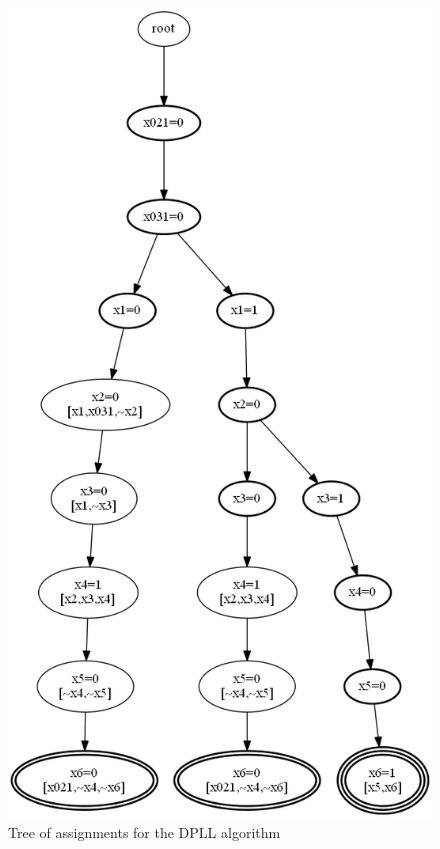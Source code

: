 \documentclass[11pt]{report}
\begin{document}
\begin{figure}
\begin{center}
\includegraphics[keepaspectratio=true,height=.9\textheight]{tree1-bw}
\end{center}
\caption{Tree of assignments for the DPLL algorithm}\label{tree1}
\end{figure}
\end{document}
